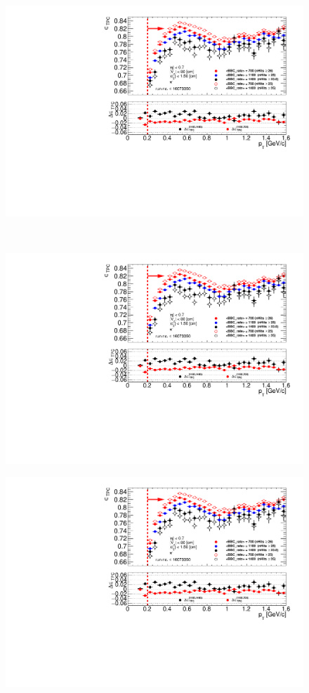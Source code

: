 \begin{figure}[b!]
	\centering
	\parbox{0.495\textwidth}{
		\centering
		\includegraphics[width=\linewidth,page=1]{graphics/systematicsEfficiency/bbc_and/tpcEffi.pdf}\\
	}~
	\parbox{0.495\textwidth}{
		\centering
		\includegraphics[width=\linewidth,page=2]{graphics/systematicsEfficiency/bbc_and/tpcEffi.pdf}\\
	}\newline
	\parbox{0.495\textwidth}{
		\centering
		\includegraphics[width=\linewidth,page=3]{graphics/systematicsEfficiency/bbc_and/tpcEffi.pdf}\\
}
\end{figure}
